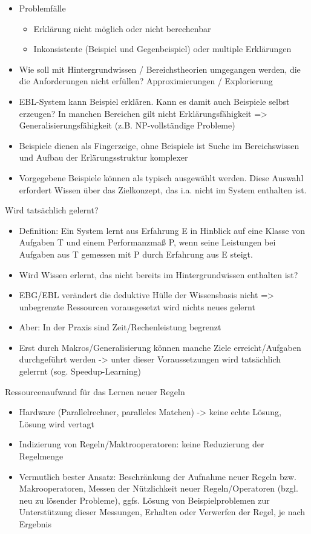 \documentclass[paper=a4, fontsize=11pt]{scrartcl} %
\numberwithin{equation}{section} %
\numberwithin{figure}{section} %
\numberwithin{table}{section} %
\begin{document}
\begin{itemize}
\item Problemfälle
\begin{itemize}
\item Erklärung nicht möglich oder nicht berechenbar
\item Inkonsistente (Beispiel und Gegenbeispiel) oder multiple Erklärungen
\end{itemize}
\item Wie soll mit Hintergrundwissen / Bereichstheorien umgegangen werden, die die Anforderungen nicht erfüllen? Approximierungen / Explorierung
\item EBL-System kann Beispiel erklären. Kann es damit auch Beispiele selbst erzeugen? In manchen Bereichen gilt nicht Erklärungsfähigkeit => Generalisierungsfähigkeit (z.B. NP-vollständige Probleme)
\item Beispiele dienen als Fingerzeige, ohne Beispiele ist Suche im Bereichswissen und Aufbau der Erlärungsstruktur komplexer
\item Vorgegebene Beispiele können als typisch ausgewählt werden. Diese Auswahl erfordert Wissen über das Zielkonzept, das i.a. nicht im System enthalten ist.
\end{itemize}

Wird tatsächlich gelernt?
\begin{itemize}
\item Definition: Ein System lernt aus Erfahrung E in Hinblick auf eine Klasse von Aufgaben T und einem Performanzmaß P, wenn seine Leistungen bei Aufgaben aus T gemessen mit P durch Erfahrung aus E steigt.
\item Wird Wissen erlernt, das nicht bereits im Hintergrundwissen enthalten ist?
\item EBG/EBL verändert die deduktive Hülle der Wissensbasis nicht => unbegrenzte Ressourcen vorausgesetzt wird nichts neues gelernt
\item Aber: In der Praxis sind Zeit/Rechenleistung begrenzt
\item Erst durch Makros/Generalisierung können manche Ziele erreicht/Aufgaben durchgeführt werden -> unter dieser Voraussetzungen wird tatsächlich gelerrnt (sog. Speedup-Learning)
\end{itemize}

Ressourcenaufwand für das Lernen neuer Regeln
\begin{itemize}
\item Hardware (Parallelrechner, paralleles Matchen) -> keine echte Lösung, Lösung wird vertagt
\item Indizierung von Regeln/Maktrooperatoren: keine Reduzierung der Regelmenge
\item Vermutlich bester Ansatz: Beschränkung der Aufnahme neuer Regeln bzw. Makrooperatoren, Messen der Nützlichkeit neuer Regeln/Operatoren (bzgl. neu zu lösender Probleme), ggfs. Lösung von Beispielproblemen zur Unterstützung dieser Messungen, Erhalten oder Verwerfen der Regel, je nach Ergebnis
\end{itemize}
\end{document}
